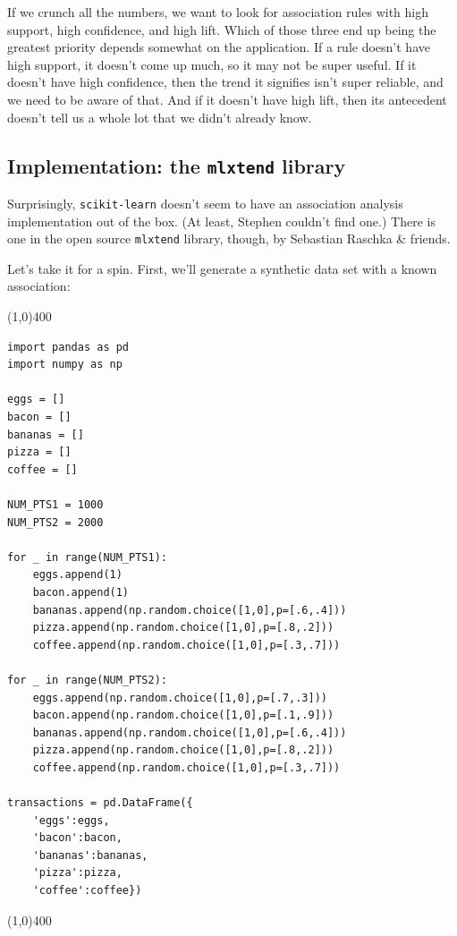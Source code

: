 \documentclass[12pt]{article}
\begin{document}
If we crunch all the numbers, we want to look for association rules with high
support, high confidence, and high lift. Which of those three end up being
the greatest priority depends somewhat on the application. If a rule doesn't
have high support, it doesn't come up much, so it may not be super useful. If
it doesn't have high confidence, then the trend it signifies isn't super
reliable, and we need to be aware of that. And if it doesn't have high lift,
then its antecedent doesn't tell us a whole lot that we didn't already know.

\subsection{Implementation: the \texttt{mlxtend} library}

Surprisingly, \texttt{scikit-learn} doesn't seem to have an association
analysis implementation out of the box. (At least, Stephen couldn't find one.)
There is one in the open source \texttt{mlxtend} library, though, by Sebastian
Raschka \& friends.

Let's take it for a spin. First, we'll generate a synthetic data set with a
known association:

\vspace{-.15in}
\begin{center}
\line(1,0){400}
\end{center}
\footnotesize
\begin{Verbatim}[fontsize=\small,samepage=true,frame=none]
import pandas as pd
import numpy as np

eggs = []
bacon = []
bananas = []
pizza = []
coffee = []

NUM_PTS1 = 1000
NUM_PTS2 = 2000

for _ in range(NUM_PTS1):
    eggs.append(1)
    bacon.append(1)
    bananas.append(np.random.choice([1,0],p=[.6,.4]))
    pizza.append(np.random.choice([1,0],p=[.8,.2]))
    coffee.append(np.random.choice([1,0],p=[.3,.7]))

for _ in range(NUM_PTS2):
    eggs.append(np.random.choice([1,0],p=[.7,.3]))
    bacon.append(np.random.choice([1,0],p=[.1,.9]))
    bananas.append(np.random.choice([1,0],p=[.6,.4]))
    pizza.append(np.random.choice([1,0],p=[.8,.2]))
    coffee.append(np.random.choice([1,0],p=[.3,.7]))

transactions = pd.DataFrame({
    'eggs':eggs,
    'bacon':bacon,
    'bananas':bananas,
    'pizza':pizza,
    'coffee':coffee})
\end{Verbatim}
\vspace{-.2in}
\begin{center}
\line(1,0){400}
\end{center}
\normalsize
\end{document}
